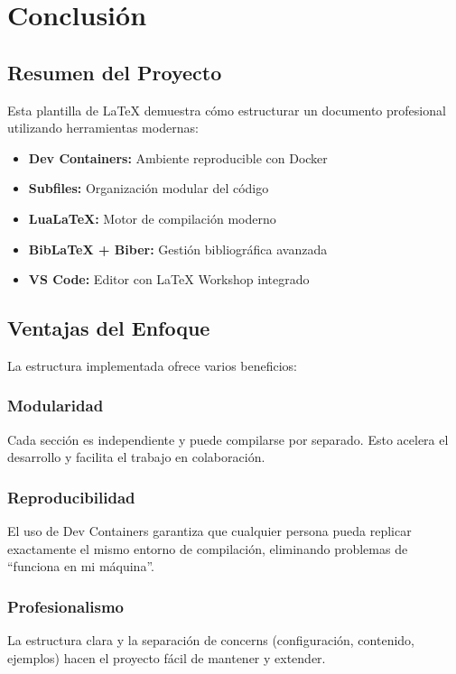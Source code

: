 \documentclass[/work/src/main.tex]{subfiles}
\begin{document}
\section{Conclusión}

\subsection{Resumen del Proyecto}
Esta plantilla de LaTeX demuestra cómo estructurar un documento profesional utilizando herramientas modernas:

\begin{itemize}
    \item \textbf{Dev Containers:} Ambiente reproducible con Docker
    \item \textbf{Subfiles:} Organización modular del código
    \item \textbf{LuaLaTeX:} Motor de compilación moderno
    \item \textbf{BibLaTeX + Biber:} Gestión bibliográfica avanzada
    \item \textbf{VS Code:} Editor con LaTeX Workshop integrado
\end{itemize}

\subsection{Ventajas del Enfoque}
La estructura implementada ofrece varios beneficios:

\subsubsection{Modularidad}
Cada sección es independiente y puede compilarse por separado. Esto acelera el desarrollo y facilita el trabajo en colaboración.

\subsubsection{Reproducibilidad}
El uso de Dev Containers garantiza que cualquier persona pueda replicar exactamente el mismo entorno de compilación, eliminando problemas de ``funciona en mi máquina''.

\subsubsection{Profesionalismo}
La estructura clara y la separación de concerns (configuración, contenido, ejemplos) hacen el proyecto fácil de mantener y extender.
\end{document}
